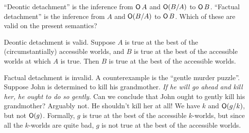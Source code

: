 \begin{exercise}
  ``Deontic detachment'' is the inference from $\operatorname{\mathsf{O}} A $ and $\operatorname{\mathsf{O}}(B/A)$ to
  $\operatorname{\mathsf{O}} B$. ``Factual detachment'' is the inference from $A$ and $\operatorname{\mathsf{O}}(B/A)$ to
  $\operatorname{\mathsf{O}} B$. Which of these are valid on the present semantics?
\end{exercise}
\begin{solution}
  Deontic detachment is valid. Suppose $A$ is true at the best of the
  (circumstantially) accessible worlds, and $B$ is true at the best of the
  accessible worlds at which $A$ is true. Then $B$ is true at the best of the
  accessible worlds.

  Factual detachment is invalid. A counterexample is the ``gentle murder
  puzzle''. Suppose John is determined to kill his grandmother. \emph{If he will
    go ahead and kill her, he ought to do so gently}. Can we conclude that John
  ought to gently kill his grandmother? Arguably not. He shouldn't kill her at
  all! We have $k$ and $\operatorname{\mathsf{O}}(g/k)$, but not $\operatorname{\mathsf{O}}(g)$. Formally, $g$ is true at
  the best of the accessible $k$-worlds, but since all the $k$-worlds are quite
  bad, $g$ is not true at the best of the accessible worlds.
\end{solution}


